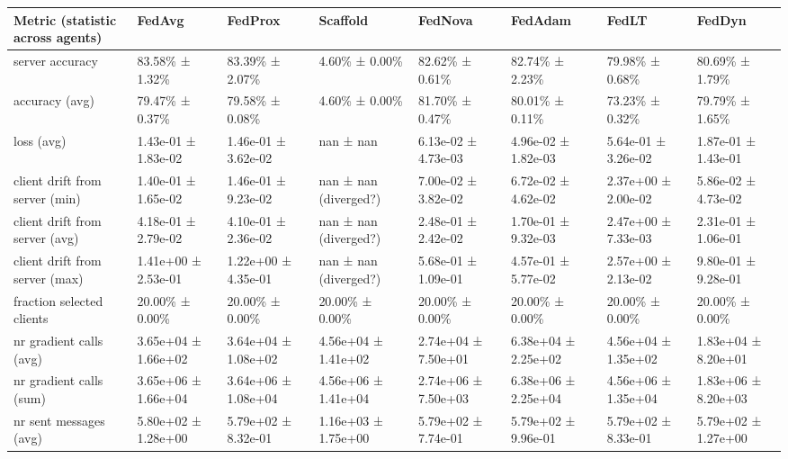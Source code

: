 \begin{tabular}{llllllll}
\hline
 Metric (statistic across agents)   & FedAvg              & FedProx             & Scaffold              & FedNova             & FedAdam             & FedLT               & FedDyn              \\
\hline
 server accuracy                    & 83.58\% ± 1.32\%      & 83.39\% ± 2.07\%      & 4.60\% ± 0.00\%         & 82.62\% ± 0.61\%      & 82.74\% ± 2.23\%      & 79.98\% ± 0.68\%      & 80.69\% ± 1.79\%      \\
 accuracy (avg)                     & 79.47\% ± 0.37\%      & 79.58\% ± 0.08\%      & 4.60\% ± 0.00\%         & 81.70\% ± 0.47\%      & 80.01\% ± 0.11\%      & 73.23\% ± 0.32\%      & 79.79\% ± 1.65\%      \\
 loss (avg)                         & 1.43e-01 ± 1.83e-02 & 1.46e-01 ± 3.62e-02 & nan ± nan             & 6.13e-02 ± 4.73e-03 & 4.96e-02 ± 1.82e-03 & 5.64e-01 ± 3.26e-02 & 1.87e-01 ± 1.43e-01 \\
 client drift from server (min)     & 1.40e-01 ± 1.65e-02 & 1.46e-01 ± 9.23e-02 & nan ± nan (diverged?) & 7.00e-02 ± 3.82e-02 & 6.72e-02 ± 4.62e-02 & 2.37e+00 ± 2.00e-02 & 5.86e-02 ± 4.73e-02 \\
 client drift from server (avg)     & 4.18e-01 ± 2.79e-02 & 4.10e-01 ± 2.36e-02 & nan ± nan (diverged?) & 2.48e-01 ± 2.42e-02 & 1.70e-01 ± 9.32e-03 & 2.47e+00 ± 7.33e-03 & 2.31e-01 ± 1.06e-01 \\
 client drift from server (max)     & 1.41e+00 ± 2.53e-01 & 1.22e+00 ± 4.35e-01 & nan ± nan (diverged?) & 5.68e-01 ± 1.09e-01 & 4.57e-01 ± 5.77e-02 & 2.57e+00 ± 2.13e-02 & 9.80e-01 ± 9.28e-01 \\
 fraction selected clients          & 20.00\% ± 0.00\%      & 20.00\% ± 0.00\%      & 20.00\% ± 0.00\%        & 20.00\% ± 0.00\%      & 20.00\% ± 0.00\%      & 20.00\% ± 0.00\%      & 20.00\% ± 0.00\%      \\
 nr gradient calls (avg)            & 3.65e+04 ± 1.66e+02 & 3.64e+04 ± 1.08e+02 & 4.56e+04 ± 1.41e+02   & 2.74e+04 ± 7.50e+01 & 6.38e+04 ± 2.25e+02 & 4.56e+04 ± 1.35e+02 & 1.83e+04 ± 8.20e+01 \\
 nr gradient calls (sum)            & 3.65e+06 ± 1.66e+04 & 3.64e+06 ± 1.08e+04 & 4.56e+06 ± 1.41e+04   & 2.74e+06 ± 7.50e+03 & 6.38e+06 ± 2.25e+04 & 4.56e+06 ± 1.35e+04 & 1.83e+06 ± 8.20e+03 \\
 nr sent messages (avg)             & 5.80e+02 ± 1.28e+00 & 5.79e+02 ± 8.32e-01 & 1.16e+03 ± 1.75e+00   & 5.79e+02 ± 7.74e-01 & 5.79e+02 ± 9.96e-01 & 5.79e+02 ± 8.33e-01 & 5.79e+02 ± 1.27e+00 \\

\end{tabular}
